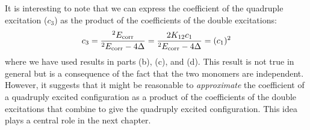 \documentclass[a4paper]{book}
\newcounter{exercise}[chapter]
\newcounter{solution}[chapter]
\newcommand{\corr}{{\rm corr}}
\begin{document}
\begin{exercise}
	It is interesting to note that we can express the coefficient of the quadruple excitation ($c_3$) as the product of the coefficients of the double excitations:
	\[
		c_3 = \frac{ {}^{2} E_\corr }{ {}^{2} E_\corr - 4\Delta } = \frac{ 2 K_{12} c_1 }{ {}^{2} E_\corr - 4\Delta } = (c_1)^2
	\]
	where we have used results in parts (b), (c), and (d). This result is not true in general but is a consequence of the fact that the two monomers are independent. However, it suggests that it might be reasonable to {\it approximate} the coefficient of a quadruply excited configuration as a product of the coefficients of the double excitations that combine to give the quadruply excited configuration. This idea plays a central role in the next chapter.
	\end{exercise}
	
	\begin{solution}
	
	\begin{itemize}
		

\end{itemize}
\end{solution}
\end{document}
